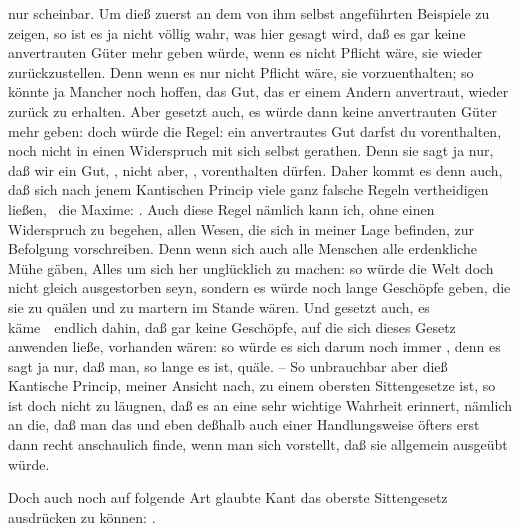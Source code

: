\begin{aufza}
nur scheinbar. Um dieß zuerst an dem von ihm selbst angeführten Beispiele zu zeigen, so ist es ja nicht völlig wahr, was hier gesagt wird, daß es gar keine anvertrauten Güter mehr geben würde, wenn es nicht Pflicht wäre, sie wieder zurückzustellen. Denn wenn es nur nicht Pflicht wäre, sie vorzuenthalten; so könnte ja Mancher noch hoffen, das Gut, das er einem Andern anvertraut, wieder zurück zu erhalten. Aber gesetzt auch, es würde dann keine anvertrauten Güter mehr geben: doch würde die Regel: ein anvertrautes Gut darfst du vorenthalten, noch nicht in einen Widerspruch mit sich selbst gerathen. Denn sie sagt ja nur, daß wir ein Gut, , nicht aber, , vorenthalten dürfen. Daher kommt es denn auch, daß sich nach jenem Kantischen Princip viele ganz falsche Regeln vertheidigen ließen, \zB\ die Maxime: . Auch diese Regel nämlich kann ich, ohne einen Widerspruch zu begehen, allen Wesen, die sich in meiner Lage befinden, zur Befolgung vorschreiben. Denn wenn sich auch alle Menschen alle erdenkliche Mühe gäben, Alles um sich her unglücklich zu machen: so würde die Welt doch nicht gleich ausgestorben seyn, sondern es würde noch lange Geschöpfe geben, die sie zu quälen und zu martern im Stande wären. Und gesetzt auch, es käme~\ endlich dahin, daß gar keine Geschöpfe, auf die sich dieses Gesetz anwenden ließe, vorhanden wären: so würde es sich darum noch immer , denn es sagt ja nur, daß man, so lange es  ist, quäle. -- So unbrauchbar aber dieß Kantische Princip, meiner Ansicht nach, zu einem obersten Sittengesetze ist, so ist doch nicht zu läugnen, daß es an eine sehr wichtige Wahrheit erinnert, nämlich an die, daß man das  und eben deßhalb auch  einer Handlungsweise öfters erst dann recht anschaulich finde, wenn man sich vorstellt, daß sie allgemein ausgeübt würde.
\item Doch auch noch auf folgende Art glaubte Kant das oberste Sittengesetz ausdrücken zu können: .
\end{aufza}\par
